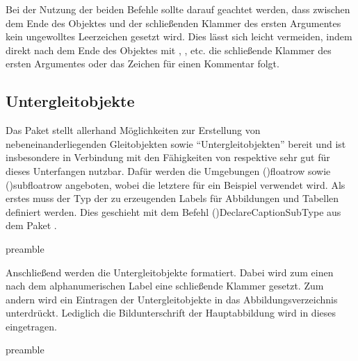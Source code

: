 \documentclass[%
  english,ngerman,%
  cdgeometry=no,DIV=12,%
  cd=false,cdfont=false,cdtitle=true,%
  headings=normal,%
  automark,%
  listof=toc,%
]{tudscrartcl}
\begin{document}
Bei der Nutzung der beiden Befehle sollte darauf geachtet werden, dass zwischen 
dem Ende des Objektes und der schließenden Klammer des ersten Argumentes kein 
ungewolltes Leerzeichen gesetzt wird. Dies lässt sich leicht vermeiden, indem 
direkt nach dem Ende des Objektes mit , 
,  etc. die 
schließende Klammer des ersten Argumentes oder das Zeichen für einen Kommentar 
\PValue{\%} folgt.

\begin{table}
\end{table}



\subsection{%
  Untergleitobjekte%
  \label{sec:subfloats}%
}

Das Paket  stellt allerhand Möglichkeiten zur Erstellung von 
nebeneinanderliegenden Gleitobjekten sowie \enquote{Untergleitobjekten} bereit 
und ist insbesondere in Verbindung mit den Fähigkeiten von  
respektive  sehr gut für dieses Unterfangen nutzbar. Dafür 
werden die Umgebungen \Environment(){floatrow} sowie 
\Environment(){subfloatrow} angeboten, wobei die letztere für 
ein Beispiel verwendet wird. Als erstes muss der Typ der zu erzeugenden Labels 
für Abbildungen und Tabellen definiert werden. Dies geschieht mit dem Befehl 
\Macro(){DeclareCaptionSubType} aus dem Paket 
.
%
\begin{Code}{preamble}
\end{Code}

Anschließend werden die Untergleitobjekte formatiert. Dabei wird zum einen nach 
dem alphanumerischen Label eine schließende Klammer gesetzt. Zum andern wird 
ein Eintragen der Untergleitobjekte in das Abbildungsverzeichnis unterdrückt. 
Lediglich die Bildunterschrift der Hauptabbildung wird in dieses eingetragen.
%
\begin{Code}[input]{preamble}
\captionsetup[subfloat]{labelformat=brace,list=off}

\end{Code}
\end{document}
